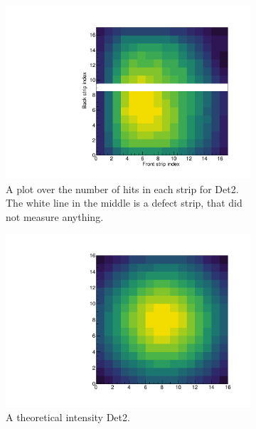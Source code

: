 \begin{figure}[h]
	\begin{subfigure}[t]{.5\linewidth}
		\centering
		\includegraphics[width=\linewidth]{../figures/mexihatDet2.pdf}
		\caption{A plot over the number of hits in each strip for Det2. The white line in the middle is a defect strip, that did not measure anything.}
		\label{fig:MexiHatDetector}
	\end{subfigure}
	\begin{subfigure}[t]{.5\linewidth}
		\centering
		\includegraphics[width=\linewidth]{../figures/mexihatDet2THEORY.pdf}
		\caption{A theoretical intensity Det2. }
		\label{fig:MexiHatDetectorTheory}
	\end{subfigure}
\caption{}
\end{figure}

